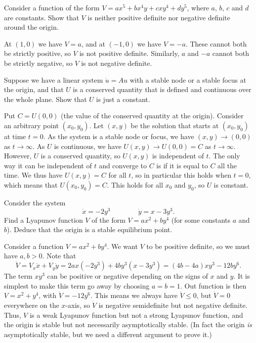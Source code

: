 \documentclass[a4paper]{amsart}
\begin{document}
\begin{exercise}\label{ex-odd-indefinite}
 Consider a function of the form $V=ax^5+bx^4y+cxy^4+dy^5$, where $a$,
 $b$, $c$ and $d$ are constants.  Show that $V$ is neither positive
 definite nor negative definite around the origin.
\end{exercise}
\begin{solution}
 At $(1,0)$ we have $V=a$, and at $(-1,0)$ we have $V=-a$.  These
 cannot both be strictly positive, so $V$ is not positive definite.
 Similarly, $a$ and $-a$ cannot both be strictly negative, so $V$ is
 not negative definite.
\end{solution}

\begin{exercise}\label{ex-conserved-constant}
 Suppose we have a linear system $\dot{u}=Au$ with a stable node or a
 stable focus at the origin, and that $U$ is a conserved quantity that
 is defined and continuous over the whole plane.  Show that $U$ is
 just a constant.
\end{exercise}
\begin{solution}
 Put $C=U(0,0)$ (the value of the conserved quantity at the origin).
 Consider an arbitrary point $(x_0,y_0)$.  Let $(x,y)$ be the solution
 that starts at $(x_0,y_0)$ at time $t=0$.  As the system is a stable
 node or focus, we have $(x,y)\to(0,0)$ as $t\to\infty$.  As $U$ is
 continuous, we have $U(x,y)\to U(0,0)=C$ as $t\to\infty$.  However,
 $U$ is a conserved quantity, so $U(x,y)$ is independent of $t$.  The
 only way it can be independent of  $t$ and converge to $C$ is if it
 is equal to $C$ all the time.  We thus have $U(x,y)=C$ for all $t$,
 so in particular this holds when $t=0$, which means that
 $U(x_0,y_0)=C$.  This holds for all $x_0$ and $y_0$, so $U$ is
 constant. 
\end{solution}

\begin{exercise}\label{ex-lyapunov-a}
 Consider the system 
 \[ \dot{x} = -2y^3 \hspace{4em} \dot{y} = x-3y^3. \]
 Find a Lyapunov function $V$ of the form $V=ax^2+by^4$ (for some
 constants $a$ and $b$).  Deduce that the origin is a stable
 equilibrium point.
\end{exercise}
\begin{solution}
 Consider a function $V=ax^2+by^4$.  We want $V$ to be positive
 definite, so we must have $a,b>0$.  Note that 
 \[ \dot{V} = V_x\dot{x} + V_y\dot{y} = 
     2ax(-2y^3) +4by^3(x-3y^3) = 
      (4b-4a)xy^3 - 12by^6.
 \]
 The term $xy^3$ can be positive or negative depending on the signs of
 $x$ and $y$.  It is simplest to make this term go away by choosing
 $a=b=1$.  Out function is then $V=x^2+y^4$, with $\dot{V}=-12y^6$.
 This means we always have $\dot{V}\leq 0$, but $\dot{V}=0$ everywhere
 on the $x$-axis, so $\dot{V}$ is negative semidefinite but not
 negative definite.  Thus, $V$ is a weak Lyapunov function but not a
 strong Lyapunov function, and the origin is stable but not
 necessarily asymptotically stable.  (In fact the origin \emph{is}
 asymptotically stable, but we need a different argument to prove it.)
\end{solution}
\end{document}
